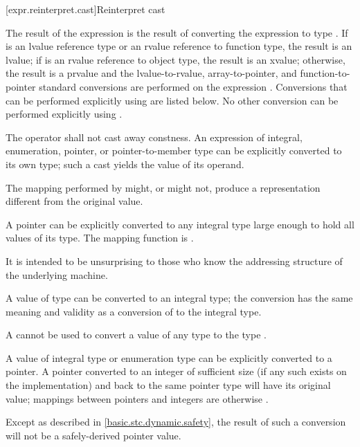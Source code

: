 [expr.reinterpret.cast]{Reinterpret cast}

\pnum
{}%
%
The result of the expression  is the
result of converting the expression  to type .
%
%
If  is an lvalue reference type or an rvalue reference to function type, the result is an lvalue;
if  is an rvalue reference to object type, the result is an xvalue;
otherwise, the result is a prvalue and the
lvalue-to-rvalue, array-to-pointer,
and function-to-pointer standard conversions are
performed on the expression . Conversions that can be performed explicitly
using  are listed below. No other conversion can
be performed explicitly using .

\pnum
The  operator shall not cast away constness.
An expression of integral, enumeration, pointer, or pointer-to-member type
can be explicitly converted to its own type; such a cast yields the value of
its operand.

\pnum
\begin{note}
The mapping performed by  might, or might not, produce a
representation different from the original value.
\end{note}

\pnum
{}%
%
A pointer can be explicitly converted to any integral type large enough
to hold all values of its type.
%
The mapping function is .
\begin{note}
It is intended to be unsurprising to those who know the addressing
structure of the underlying machine.
\end{note}
A value of type  can be converted to an integral
type; the conversion has the same meaning and validity as a conversion of
 to the integral type.
\begin{note}
A 
cannot be used to convert a value of any type to the type
.
\end{note}

\pnum
{}%
%
A value of integral type or enumeration type can be explicitly converted
to a pointer. A pointer converted to an integer of sufficient size (if
any such exists on the implementation) and back to the same pointer type
will have its original value;
%
mappings between pointers and integers are otherwise
.
\begin{note}
Except as described in \ref{basic.stc.dynamic.safety}, the result of
such a conversion will not be a safely-derived pointer value.
\end{note}

